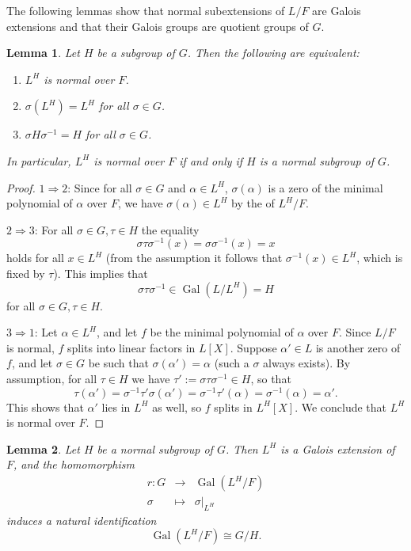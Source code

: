 \documentclass[12pt]{article}
\DeclareMathOperator{\Gal}{Gal}
\newtheorem{lemma}{Lemma}
\begin{document}
The following lemmas show that normal subextensions of $L/F$ are
Galois extensions and that their Galois groups are quotient groups of
$G$.

\begin{lemma}
\label{lemma3}
Let $H$ be a subgroup of $G$.  Then the following are equivalent:
\begin{enumerate}
\item $L^H$ is normal over $F$.
\item $\sigma\left(L^H\right)=L^H$ for all $\sigma\in G$.
\item $\sigma H\sigma^{-1}=H$ for all $\sigma\in G$.
\end{enumerate}
In particular, $L^H$ is normal over $F$ if and only if $H$ is a normal
subgroup of $G$.
\end{lemma}

\begin{proof}
$1\Rightarrow2$: Since for all $\sigma\in G$ and $\alpha\in L^H$,
$\sigma(\alpha)$ is a zero of the minimal polynomial of $\alpha$ over
$F$, we have $\sigma(\alpha)\in L^H$ by the
 of $L^H/F$.

$2\Rightarrow3$: For all $\sigma\in G,\tau\in H$ the equality
\[
\sigma\tau\sigma^{-1}(x)=\sigma\sigma^{-1}(x)=x
\]
holds for all $x\in L^H$ (from the assumption it follows that
$\sigma^{-1}(x)\in L^H$, which is fixed by $\tau$).  This implies that
\[
\sigma\tau\sigma^{-1}\in\Gal(L/L^H)=H
\]
for all $\sigma\in G,\tau\in H$.

$3\Rightarrow1$: Let $\alpha\in L^H$, and let $f$ be the minimal
polynomial of $\alpha$ over $F$.  Since $L/F$ is normal, $f$ splits
into linear factors in $L[X]$.  Suppose $\alpha'\in L$ is another zero
of $f$, and let $\sigma\in G$ be such that $\sigma(\alpha')=\alpha$
(such a $\sigma$ always exists).  By assumption, for all $\tau\in H$
we have $\tau':=\sigma\tau\sigma^{-1}\in H$, so that
\[
\tau(\alpha')=\sigma^{-1}\tau'\sigma(\alpha')
=\sigma^{-1}\tau'(\alpha)=\sigma^{-1}(\alpha)=\alpha'.
\]
This shows that $\alpha'$ lies in $L^H$ as well, so $f$ splits in
$L^H[X]$.  We conclude that $L^H$ is normal over $F$.
\end{proof}

\begin{lemma}
Let $H$ be a normal subgroup of $G$.  Then $L^H$ is a Galois extension
of $F$, and the homomorphism
\begin{eqnarray*}
r\colon G&\to&\Gal(L^H/F) \\
\sigma&\mapsto&\sigma\vert_{L^H}
\end{eqnarray*}
induces a natural identification
\[
\Gal(L^H/F)\cong G/H.
\]
\end{lemma}
\end{document}

